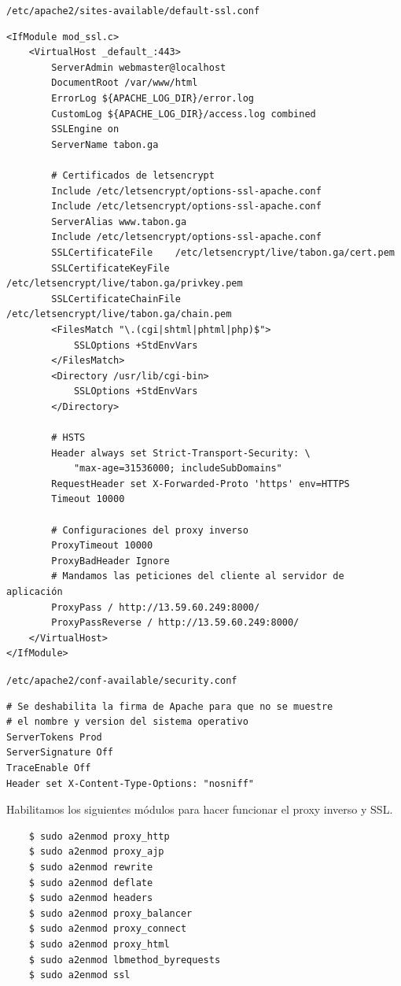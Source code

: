 \documentclass[9pt]{article}
\begin{document}
\texttt{/etc/apache2/sites-available/default-ssl.conf}

\begin{verbatim}
<IfModule mod_ssl.c>
    <VirtualHost _default_:443>
        ServerAdmin webmaster@localhost
        DocumentRoot /var/www/html
        ErrorLog ${APACHE_LOG_DIR}/error.log
        CustomLog ${APACHE_LOG_DIR}/access.log combined
        SSLEngine on
        ServerName tabon.ga

        # Certificados de letsencrypt
        Include /etc/letsencrypt/options-ssl-apache.conf
        Include /etc/letsencrypt/options-ssl-apache.conf
        ServerAlias www.tabon.ga
        Include /etc/letsencrypt/options-ssl-apache.conf
        SSLCertificateFile    /etc/letsencrypt/live/tabon.ga/cert.pem
        SSLCertificateKeyFile    /etc/letsencrypt/live/tabon.ga/privkey.pem
        SSLCertificateChainFile    /etc/letsencrypt/live/tabon.ga/chain.pem
        <FilesMatch "\.(cgi|shtml|phtml|php)$">
            SSLOptions +StdEnvVars
        </FilesMatch>
        <Directory /usr/lib/cgi-bin>
            SSLOptions +StdEnvVars
        </Directory>

        # HSTS
        Header always set Strict-Transport-Security: \
            "max-age=31536000; includeSubDomains"
        RequestHeader set X-Forwarded-Proto 'https' env=HTTPS        
        Timeout 10000

        # Configuraciones del proxy inverso
        ProxyTimeout 10000
        ProxyBadHeader Ignore
        # Mandamos las peticiones del cliente al servidor de aplicación
        ProxyPass / http://13.59.60.249:8000/
        ProxyPassReverse / http://13.59.60.249:8000/
    </VirtualHost>
</IfModule>
\end{verbatim}

\texttt{/etc/apache2/conf-available/security.conf}

\begin{verbatim}
# Se deshabilita la firma de Apache para que no se muestre
# el nombre y version del sistema operativo
ServerTokens Prod
ServerSignature Off
TraceEnable Off
Header set X-Content-Type-Options: "nosniff"
\end{verbatim}

Habilitamos los siguientes módulos para hacer funcionar el proxy inverso y \textsf{SSL}.

\begin{verbatim}
    $ sudo a2enmod proxy_http
    $ sudo a2enmod proxy_ajp
    $ sudo a2enmod rewrite
    $ sudo a2enmod deflate
    $ sudo a2enmod headers
    $ sudo a2enmod proxy_balancer
    $ sudo a2enmod proxy_connect
    $ sudo a2enmod proxy_html
    $ sudo a2enmod lbmethod_byrequests
    $ sudo a2enmod ssl
\end{verbatim}
\end{document}
